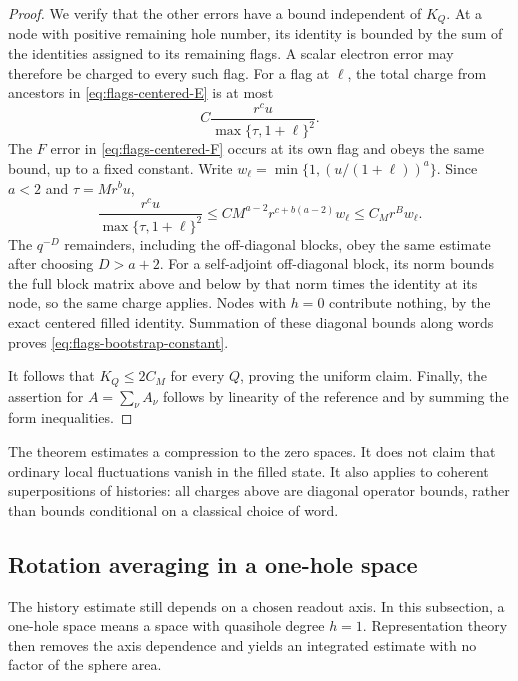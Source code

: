 \begin{proof}
We verify that the other errors have a bound independent of $K_Q$.
At a node with positive remaining hole number, its identity is bounded
by the sum of the identities assigned to its remaining flags.  A
scalar electron error may therefore be charged to every such flag.
For a flag at $\ell$, the total charge from ancestors in
\eqref{eq:flags-centered-E} is at most
\begin{equation}
 C\frac{r^cu}{\max\{\tau,1+\ell\}^2}.
 \label{eq:flags-scalar-tail}
\end{equation}
The $F$ error in \eqref{eq:flags-centered-F} occurs at its own flag
and obeys the same bound, up to a fixed constant.  Write
$w_\ell=\min\{1,(u/(1+\ell))^a\}$.  Since $a<2$ and $\tau=Mr^bu$,
\[
 \frac{r^cu}{\max\{\tau,1+\ell\}^2}
 \leq C M^{a-2}r^{c+b(a-2)}w_\ell
 \leq C_M r^B w_\ell.
\]
The $q^{-D}$ remainders, including the off-diagonal blocks, obey the
same estimate after choosing $D>a+2$.  For a self-adjoint off-diagonal
block, its norm bounds the full block matrix above and below by that
norm times the identity at its node, so the same charge applies.
Nodes with $h=0$ contribute nothing, by the exact centered filled
identity.  Summation of these diagonal bounds along words proves
\eqref{eq:flags-bootstrap-constant}.

It follows that $K_Q\leq2C_M$ for every $Q$, proving the uniform
claim.  Finally, the assertion for $A=\sum_\nu A_\nu$ follows by
linearity of the reference and by summing the form inequalities.
\end{proof}

The theorem estimates a compression to the zero spaces.  It does not
claim that ordinary local fluctuations vanish in the filled state.
It also applies to coherent superpositions of histories: all charges
above are diagonal operator bounds, rather than bounds conditional on
a classical choice of word.

\subsection{Rotation averaging in a one-hole space}

The history estimate still depends on a chosen readout axis.  In this
subsection, a one-hole space means a space with quasihole degree $h=1$.
Representation theory then removes the axis dependence and yields an
integrated estimate with no factor of the sphere area.

